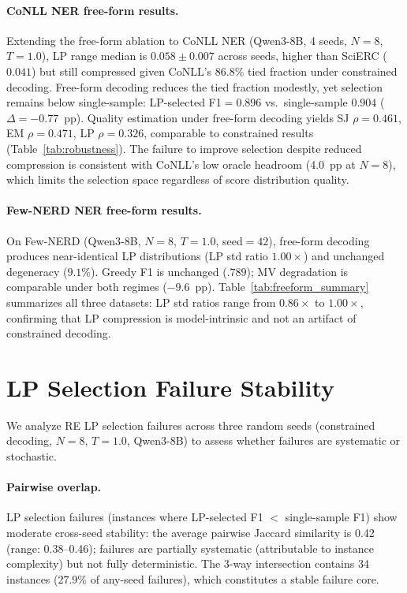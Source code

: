 \paragraph{CoNLL NER free-form results.}
Extending the free-form ablation to CoNLL NER (Qwen3-8B, 4 seeds, $N{=}8$, $T{=}1.0$), LP range median is $0.058{\pm}0.007$ across seeds, higher than SciERC ($0.041$) but still compressed given CoNLL's 86.8\% tied fraction under constrained decoding.
Free-form decoding reduces the tied fraction modestly, yet selection remains below single-sample: LP-selected F1${=}0.896$ vs.\ single-sample $0.904$ ($\Delta{=}{-}0.77$~pp).
Quality estimation under free-form decoding yields SJ $\rho{=}0.461$, EM $\rho{=}0.471$, LP $\rho{=}0.326$, comparable to constrained results (Table~\ref{tab:robustness}).
The failure to improve selection despite reduced compression is consistent with CoNLL's low oracle headroom (4.0~pp at $N{=}8$), which limits the selection space regardless of score distribution quality.

\paragraph{Few-NERD NER free-form results.}
On Few-NERD (Qwen3-8B, $N{=}8$, $T{=}1.0$, seed${=}42$), free-form decoding produces near-identical LP distributions (LP std ratio $1.00{\times}$) and unchanged degeneracy ($9.1$\%).
Greedy F1 is unchanged ($.789$); MV degradation is comparable under both regimes ($-9.6$~pp).
Table~\ref{tab:freeform_summary} summarizes all three datasets: LP std ratios range from $0.86{\times}$ to $1.00{\times}$, confirming that LP compression is model-intrinsic and not an artifact of constrained decoding.

\section{LP Selection Failure Stability}\label{app:lp_failure_stability}

We analyze RE LP selection failures across three random seeds (constrained decoding, $N{=}8$, $T{=}1.0$, Qwen3-8B) to assess whether failures are systematic or stochastic.

\paragraph{Pairwise overlap.}
LP selection failures (instances where LP-selected F1 $<$ single-sample F1) show moderate cross-seed stability: the average pairwise Jaccard similarity is 0.42 (range: 0.38--0.46); failures are partially systematic (attributable to instance complexity) but not fully deterministic.
The 3-way intersection contains 34 instances (27.9\% of any-seed failures), which constitutes a stable failure core.

